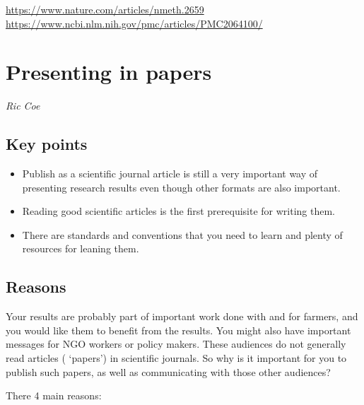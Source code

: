 \documentclass[
  titlepage]{book}
\begin{document}
\url{https://www.nature.com/articles/nmeth.2659}
\url{https://www.ncbi.nlm.nih.gov/pmc/articles/PMC2064100/}

\hypertarget{papers}{%
\chapter{Presenting in papers}\label{papers}}

\emph{Ric Coe}

\hypertarget{key-points-1}{%
\section{Key points}\label{key-points-1}}

\begin{itemize}
\item
  Publish as a scientific journal article is still a very important way of presenting research results even though other formats are also important.
\item
  Reading good scientific articles is the first prerequisite for writing them.
\item
  There are standards and conventions that you need to learn and plenty of resources for leaning them.
\end{itemize}

\hypertarget{reasons}{%
\section{Reasons}\label{reasons}}

Your results are probably part of important work done with and for farmers, and you would like them to benefit from the results. You might also have important messages for NGO workers or policy makers. These audiences do not generally read articles ( `papers') in scientific journals. So why is it important for you to publish such papers, as well as communicating with those other audiences?

There 4 main reasons:
\end{document}
